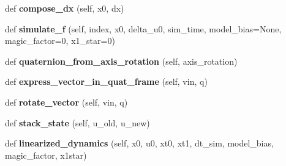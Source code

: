 \begin{DoxyCompactItemize}
def {\bfseries compose\+\_\+dx} (self, x0, dx)
\item 
\hypertarget{classaml__lfd_1_1ilqr_1_1ilqr__traj__follow_1_1_d_d_p___traj_follow_class_ae8418394dde78d3d159503ba981393f0}{}\label{classaml__lfd_1_1ilqr_1_1ilqr__traj__follow_1_1_d_d_p___traj_follow_class_ae8418394dde78d3d159503ba981393f0} 
def {\bfseries simulate\+\_\+f} (self, index, x0, delta\+\_\+u0, sim\+\_\+time, model\+\_\+bias=None, magic\+\_\+factor=0, x1\+\_\+star=0)
\item 
\hypertarget{classaml__lfd_1_1ilqr_1_1ilqr__traj__follow_1_1_d_d_p___traj_follow_class_a3ccc445d558a3160ff141f015eea6de2}{}\label{classaml__lfd_1_1ilqr_1_1ilqr__traj__follow_1_1_d_d_p___traj_follow_class_a3ccc445d558a3160ff141f015eea6de2} 
def {\bfseries quaternion\+\_\+from\+\_\+axis\+\_\+rotation} (self, axis\+\_\+rotation)
\item 
\hypertarget{classaml__lfd_1_1ilqr_1_1ilqr__traj__follow_1_1_d_d_p___traj_follow_class_a669e3f71792e2ef8663a238e337d2675}{}\label{classaml__lfd_1_1ilqr_1_1ilqr__traj__follow_1_1_d_d_p___traj_follow_class_a669e3f71792e2ef8663a238e337d2675} 
def {\bfseries express\+\_\+vector\+\_\+in\+\_\+quat\+\_\+frame} (self, vin, q)
\item 
\hypertarget{classaml__lfd_1_1ilqr_1_1ilqr__traj__follow_1_1_d_d_p___traj_follow_class_a484595fedd985a84a77383fdd2a05506}{}\label{classaml__lfd_1_1ilqr_1_1ilqr__traj__follow_1_1_d_d_p___traj_follow_class_a484595fedd985a84a77383fdd2a05506} 
def {\bfseries rotate\+\_\+vector} (self, vin, q)
\item 
\hypertarget{classaml__lfd_1_1ilqr_1_1ilqr__traj__follow_1_1_d_d_p___traj_follow_class_a57763c20342b3a325984860634fa6ba2}{}\label{classaml__lfd_1_1ilqr_1_1ilqr__traj__follow_1_1_d_d_p___traj_follow_class_a57763c20342b3a325984860634fa6ba2} 
def {\bfseries stack\+\_\+state} (self, u\+\_\+old, u\+\_\+new)
\item 
\hypertarget{classaml__lfd_1_1ilqr_1_1ilqr__traj__follow_1_1_d_d_p___traj_follow_class_ae2d2169968ed619938372318ae329786}{}\label{classaml__lfd_1_1ilqr_1_1ilqr__traj__follow_1_1_d_d_p___traj_follow_class_ae2d2169968ed619938372318ae329786} 
def {\bfseries linearized\+\_\+dynamics} (self, x0, u0, xt0, xt1, dt\+\_\+sim, model\+\_\+bias, magic\+\_\+factor, x1star)
\item 
\hypertarget{classaml__lfd_1_1ilqr_1_1ilqr__traj__follow_1_1_d_d_p___traj_follow_class_aecd53d017dda46c356550d262cd04952}{}\label{classaml__lfd_1_1ilqr_1_1ilqr__traj__follow_1_1_d_d_p___traj_follow_class_aecd53d017dda46c356550d262cd04952} 

\end{DoxyCompactItemize}
